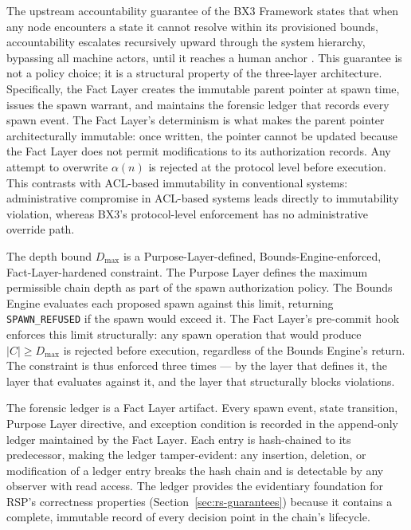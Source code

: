 The upstream accountability guarantee of the BX3 Framework states that when any node encounters a state it cannot resolve within its provisioned bounds, accountability escalates recursively upward through the system hierarchy, bypassing all machine actors, until it reaches a human anchor \cite{bx3-framework,bx3framework2026}. This guarantee is not a policy choice; it is a structural property of the three-layer architecture. Specifically, the Fact Layer creates the immutable parent pointer at spawn time, issues the spawn warrant, and maintains the forensic ledger that records every spawn event. The Fact Layer's determinism is what makes the parent pointer architecturally immutable: once written, the pointer cannot be updated because the Fact Layer does not permit modifications to its authorization records. Any attempt to overwrite $\alpha(n)$ is rejected at the protocol level before execution. This contrasts with ACL-based immutability in conventional systems: administrative compromise in ACL-based systems leads directly to immutability violation, whereas BX3's protocol-level enforcement has no administrative override path.

The depth bound $D_{\max}$ is a Purpose-Layer-defined, Bounds-Engine-enforced, Fact-Layer-hardened constraint. The Purpose Layer defines the maximum permissible chain depth as part of the spawn authorization policy. The Bounds Engine evaluates each proposed spawn against this limit, returning \texttt{SPAWN\_REFUSED} if the spawn would exceed it. The Fact Layer's pre-commit hook enforces this limit structurally: any spawn operation that would produce $|C| \geq D_{\max}$ is rejected before execution, regardless of the Bounds Engine's return. The constraint is thus enforced three times --- by the layer that defines it, the layer that evaluates against it, and the layer that structurally blocks violations.

The forensic ledger is a Fact Layer artifact. Every spawn event, state transition, Purpose Layer directive, and exception condition is recorded in the append-only ledger maintained by the Fact Layer. Each entry is hash-chained to its predecessor, making the ledger tamper-evident: any insertion, deletion, or modification of a ledger entry breaks the hash chain and is detectable by any observer with read access. The ledger provides the evidentiary foundation for RSP's correctness properties (Section~\ref{sec:rs-guarantees}) because it contains a complete, immutable record of every decision point in the chain's lifecycle.

